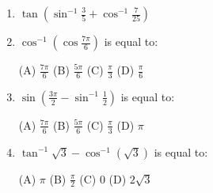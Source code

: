 \documentclass[a4paper,12pt]{article}                                                                       \usepackage{amsmath, amssymb, xcolor, tcolorbox}                                                            \usepackage{geometry}
\begin{document}
\begin{enumerate}                                                                                      \item[\textcolor{blue}{18}] $\tan \left( \sin^{-1} \frac{3}{5} + \cos^{-1} \frac{7}{25} \right)$
    \item[\textcolor{blue}{19}] $\cos^{-1} \left( \cos \frac{7\pi}{6} \right)$ is equal to:
    \begin{tabbing}
        (A) \( \frac{7\pi}{6} \) \hspace{1cm} (B) \( \frac{5\pi}{6} \) \hspace{1cm} (C) \( \frac{\pi}{3} \) \hspace{1cm} (D) \( \frac{\pi}{6} \)
    \end{tabbing}
                                                                                                                \item[\textcolor{blue}{20}] $\sin \left( \frac{3\pi}{2} - \sin^{-1} \frac{1}{2} \right)$ is equal to:
    \begin{tabbing}                                                                                                 (A) $\frac{7\pi}{6}$ \hspace{1cm} (B) $\frac{5\pi}{6}$ \hspace{1cm} (C) $\frac{\pi}{3}$ \hspace{1cm} (D) $\pi$
    \end{tabbing}
    \item[\textcolor{blue}{21}] $\tan^{-1} \sqrt{3} - \cos^{-1} (\sqrt{3})$ is equal to:
    \begin{tabbing}
        (A) $\pi$ \hspace{1cm} (B) $\frac{\pi}{2}$ \hspace{1cm} (C) $0$ \hspace{1cm} (D) $2\sqrt{3}$
    \end{tabbing}
\end{enumerate}
\end{document}
